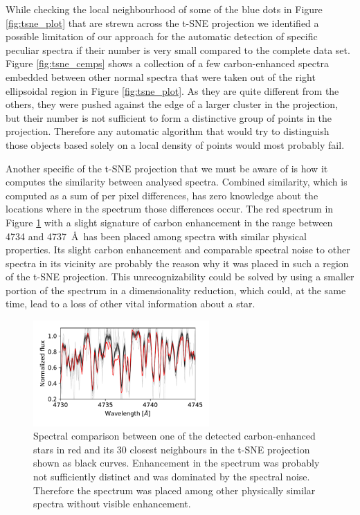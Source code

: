 While checking the local neighbourhood of some of the blue dots in Figure \ref{fig:tsne_plot} that are strewn across the t-SNE projection we identified a possible limitation of our approach for the automatic detection of specific peculiar spectra if their number is very small compared to the complete data set. Figure \ref{fig:tsne_cemps} shows a collection of a few carbon-enhanced spectra embedded between other normal spectra that were taken out of the right ellipsoidal region in Figure \ref{fig:tsne_plot}. As they are quite different from the others, they were pushed against the edge of a larger cluster in the projection, but their number is not sufficient to form a distinctive group of points in the projection. Therefore any automatic algorithm that would try to distinguish those objects based solely on a local density of points would most probably fail.

Another specific of the t-SNE projection that we must be aware of is how it computes the similarity between analysed spectra. Combined similarity, which is computed as a sum of per pixel differences, has zero knowledge about the locations where in the spectrum those differences occur. The red spectrum in Figure \ref{fig:tsne_30close} with a slight signature of carbon enhancement in the range between 4734 and 4737~\AA\ has been placed among spectra with similar physical properties. Its slight carbon enhancement and comparable spectral noise to other spectra in its vicinity are probably the reason why it was placed in such a region of the t-SNE projection. This unrecognizability could be solved by using a smaller portion of the spectrum in a dimensionality reduction, which could, at the same time, lead to a loss of other vital information about a star.

\begin{figure}
	\centering
	\includegraphics[width=0.6\textwidth]{150206004301057_tsne_close30.pdf}
	\caption{Spectral comparison between one of the detected carbon-enhanced stars in red and its 30 closest neighbours in the t-SNE projection shown as black curves. Enhancement in the spectrum was probably not sufficiently distinct and was dominated by the spectral noise. Therefore the spectrum was placed among other physically similar spectra without visible enhancement.}
	\label{fig:tsne_30close}
\end{figure}

